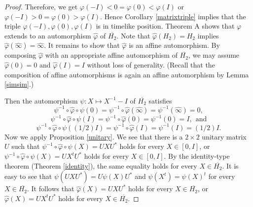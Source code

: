 \documentclass[10pt,a4paper]{amsart}
\newcommand\oH{{\overline{H_2}}}
\newcommand\oi{{\widehat{\infty}}}
\theoremstyle{definition}
\theoremstyle{remark}
\numberwithin{subsection}{section}
\numberwithin{equation}{section}
\begin{document}
\begin{proof}
Therefore, we get $\varphi(-I)<0=\varphi(0)<\varphi(I)$ or $\varphi(-I)>0=\varphi(0)>\varphi(I)$.
Hence Corollary \ref{matrixtriple} implies that the triple $\varphi(-I), \varphi(0), \varphi(I)$ is in timelike position. 
Theorem A shows that $\varphi$ extends to an automorphism $\hat{\varphi}$ of $\oH$. 
Note that $\hat{\varphi}(H_2)=H_2$ implies $\hat{\varphi}(\oi)=\oi$.
It remains to show that $\hat{\varphi}$ is an affine automorphism.
By composing $\hat{\varphi}$ with an appropriate affine automorphism of $\oH$, we may assume $\hat{\varphi}(0)=0$ and $\hat{\varphi}(I)=I$ without loss of generality. (Recall that the composition of affine automorphisms is again an affine automorphism by Lemma \ref{simsim}.) 

Then the automorphism $\psi \colon X\mapsto X^{-1}-I$ of $\oH$ satisfies 
\[
\psi^{-1}\circ \hat{\varphi}\circ\psi(0) = \psi^{-1}\circ \hat{\varphi}(\oi) = \psi^{-1}(\oi)=0,
\]
\[
\psi^{-1}\circ \hat{\varphi}\circ\psi(I)=\psi^{-1}\circ \hat{\varphi}(0) = \psi^{-1}(0) =I,\ \ \text{and}
\]
\[
\psi^{-1}\circ \hat{\varphi}\circ\psi((1/2)I)=\psi^{-1}\circ \hat{\varphi}(I) =\psi^{-1}(I) =(1/2)I.
\]
Now we apply Proposition \ref{unitary}.
We see that there is a $2\times 2$ unitary matrix $U$ such that $\psi^{-1}\circ \hat{\varphi}\circ\psi(X)=UXU^*$ holds for every $X\in [0, I]$, or $\psi^{-1}\circ \hat{\varphi}\circ\psi(X)=UX^tU^*$ holds for every $X\in [0, I]$. 
By the identity-type theorem (Theorem \ref{identity}), the same equality holds for every $X\in \oH$. 
It is easy to see that $\psi(UXU^*)=U\psi(X)U^*$ and $\psi(X^t)=\psi(X)^t$ for every $X\in \oH$. 
It follows that $\hat{\varphi}(X)=UXU^*$ holds for every $X\in \oH$, or $\hat{\varphi}(X)=UX^tU^*$ holds for every $X\in \oH$. 
\end{proof}
\end{document}
